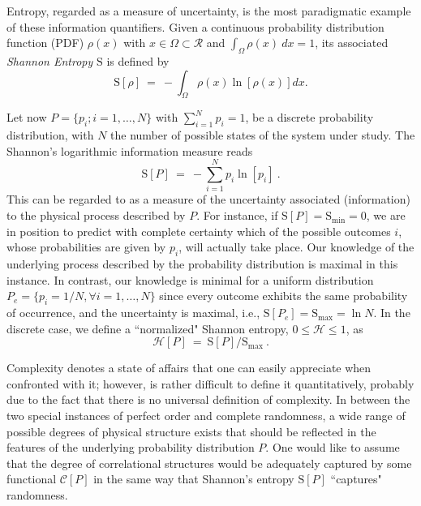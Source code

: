 Entropy, regarded as a measure of uncertainty, is the most paradigmatic example of these information quantifiers.
Given a continuous probability distribution function (PDF) $\rho(x)$ with $x \in \Omega \subset \mathcal{R}$ and 
$\int_{\Omega} \rho(x)~dx = 1$, its associated {\it Shannon Entropy\/} ${\mathrm S}$ 
\cite{Shannon1948,Weaver1949} is defined by
\begin{equation}
\label{shannon}
{\mathrm S}[\rho] ~=~ -\int_{\Omega} \rho(x) \ln \left[\rho(x)\right]  dx .
\end{equation}

Let now $P=\{p_i; i=1,\ldots, N\}$ with $\sum_{i=1}^N p_i = 1$, be a  discrete probability distribution, with $N$ 
the number of possible states of the system under study.
The Shannon's logarithmic information measure reads
\begin{equation}
\label{Shannon-disc}
{\mathrm S}[P] ~=~ -\sum_{i=1}^{N} p_i \ln \left[ p_i \right] \ .
\end{equation}
This can be regarded to as a measure of the uncertainty associated (information) to the physical process described 
by $P$.
For instance, if ${\mathrm S}[P] = {\mathrm S}_{\min} = 0$, we are in position to predict with complete certainty 
which of the possible outcomes $i$, whose probabilities are given by $p_i$, will actually take place. 
Our knowledge of the underlying process described by the probability distribution is maximal in this instance. 
In contrast, our knowledge is minimal for a uniform distribution $P_e = \{ p_i = 1/N, \forall i=1, \ldots , N \}$
since every outcome exhibits the same probability of occurrence, and the uncertainty is maximal, i.e.,
${\mathrm S}[P_e] = {\mathrm S}_{\max} = \ln N$.
In the discrete case,  we define a ``normalized" Shannon entropy, $0 \leq {\mathcal H} \leq 1$, as
\begin{equation}
\label{shannon-disc-normalizada}
{\mathcal H} [P]~=~{\mathrm S}[P]  / {\mathrm S}_{\max} \ .
\end{equation}


Complexity denotes a state of affairs that one can easily appreciate when confronted with it; however,
is rather difficult to define it quantitatively, probably due to the fact that there is no universal
definition of complexity.
In between the two special instances of perfect order and complete randomness, a wide range of possible
degrees of physical structure exists that should be reflected in the features of the underlying
probability distribution $P$.
One would like to assume that the degree of correlational structures would be adequately captured
by some functional ${\mathcal C} [P]$ in the same way that Shannon's entropy ${\mathrm S}[P]$ 
\cite{Shannon1948} ``captures" randomness.

